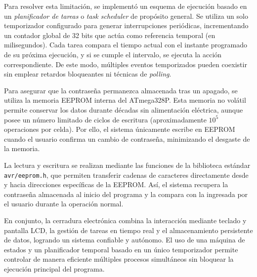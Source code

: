     \vspace{1em}

    Para resolver esta limitación, se implementó un esquema de ejecución basado en un \textit{planificador de tareas} o \textit{task scheduler} de propósito general. Se utiliza un solo temporizador configurado para generar interrupciones periódicas, incrementando un contador global de 32 bits que actúa como referencia temporal (en milisegundos). Cada tarea compara el tiempo actual con el instante programado de su próxima ejecución, y si se cumple el intervalo, se ejecuta la acción correspondiente. De este modo, múltiples eventos temporizados pueden coexistir sin emplear retardos bloqueantes ni técnicas de \textit{polling}.

    \vspace{1em}

    Para asegurar que la contraseña permanezca almacenada tras un apagado, se utiliza la memoria EEPROM interna del ATmega328P. Esta memoria no volátil permite conservar los datos durante décadas sin alimentación eléctrica, aunque posee un número limitado de ciclos de escritura (aproximadamente $10^5$ operaciones por celda). Por ello, el sistema únicamente escribe en EEPROM cuando el usuario confirma un cambio de contraseña, minimizando el desgaste de la memoria.

    \vspace{1em}

    La lectura y escritura se realizan mediante las funciones de la biblioteca estándar \texttt{avr/eeprom.h}, que permiten transferir cadenas de caracteres directamente desde y hacia direcciones específicas de la EEPROM. Así, el sistema recupera la contraseña almacenada al inicio del programa y la compara con la ingresada por el usuario durante la operación normal.

    \vspace{1em}

    En conjunto, la cerradura electrónica combina la interacción mediante teclado y pantalla LCD, la gestión de tareas en tiempo real y el almacenamiento persistente de datos, logrando un sistema confiable y autónomo. El uso de una máquina de estados y un planificador temporal basado en un único temporizador permite controlar de manera eficiente múltiples procesos simultáneos sin bloquear la ejecución principal del programa.

